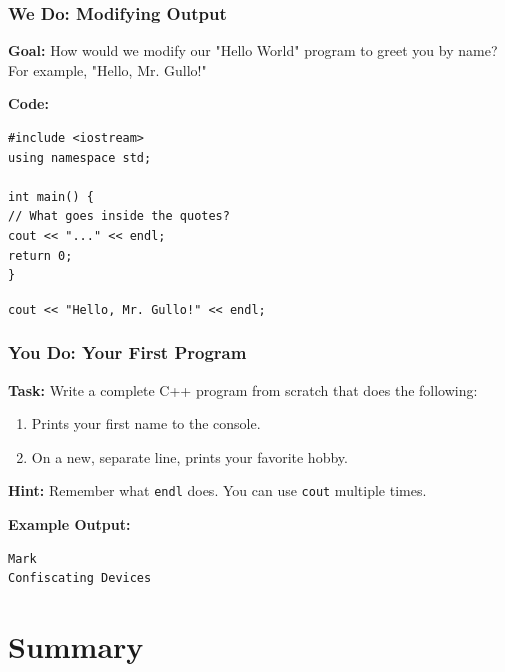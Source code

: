 \documentclass{beamer}
\begin{document}
\begin{frame}[fragile]
\frametitle{We Do: Modifying Output}
\textbf{Goal:} How would we modify our "Hello World" program to greet you by name? For example, "Hello, Mr. Gullo!"

\pause

\textbf{Code:}
\begin{lstlisting}
#include <iostream>
using namespace std;

int main() {
// What goes inside the quotes?
cout << "..." << endl;
return 0;
}
\end{lstlisting}
\pause
\vspace{1cm}
\begin{center}
\huge
\alert{\texttt{cout << "Hello, Mr. Gullo!" << endl;}}
\end{center}

\end{frame}

\begin{frame}[fragile]
\frametitle{You Do: Your First Program}
\textbf{Task:} Write a complete C++ program from scratch that does the following:
\begin{enumerate}
\item Prints your first name to the console.
\item On a \alert{new, separate line}, prints your favorite hobby.
\end{enumerate}

\pause

\textbf{Hint:} Remember what \texttt{endl} does. You can use \texttt{cout} multiple times.

\vfill
\textbf{Example Output:}
\begin{verbatim}
Mark
Confiscating Devices
\end{verbatim}
\end{frame}

\section{Summary}
\end{document}
